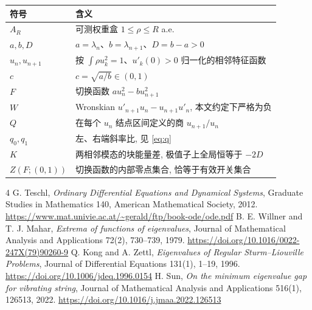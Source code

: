 \documentclass[UTF8]{ctexart}
\begin{document}
\begin{center}
\begin{tabular}{ll}
\toprule
符号 & 含义\\
\midrule
$A_R$ & 可测权重盒 $1\le\rho\le R$ a.e.\\
$a,b,D$ & $a=\lambda_n$、$b=\lambda_{n+1}$、$D=b-a>0$\\
$u_n,u_{n+1}$ & 按 $\int\rho u_k^2=1$、$u'_k(0)>0$ 归一化的相邻特征函数\\
$c$ & $c=\sqrt{a/b}\in(0,1)$\\
$F$ & 切换函数 $au_n^2-bu_{n+1}^2$\\
$W$ & Wronskian $u'_{n+1}u_n-u_{n+1}u'_n$, 本文约定下严格为负\\
$Q$ & 在每个 $u_n$ 结点区间定义的商 $u_{n+1}/u_n$\\
$q_0,q_1$ & 左、右端斜率比, 见 \eqref{eq:q}\\
$K$ & 两相邻模态的块能量差, 极值子上全局恒等于 $-2D$\\
$Z(F;(0,1))$ & 切换函数的内部零点集合, 恰等于有效开关集合\\
\bottomrule
\end{tabular}
\end{center}

\begin{thebibliography}{4}
 G. Teschl, \emph{Ordinary Differential Equations and Dynamical Systems},
	Graduate Studies in Mathematics 140, American Mathematical Society, 2012.
	\url{https://www.mat.univie.ac.at/~gerald/ftp/book-ode/ode.pdf}
 B. E. Willner and T. J. Mahar, \emph{Extrema of functions of eigenvalues},
	Journal of Mathematical Analysis and Applications 72(2), 730--739, 1979.
	\url{https://doi.org/10.1016/0022-247X(79)90260-9}
 Q. Kong and A. Zettl, \emph{Eigenvalues of Regular Sturm--Liouville Problems},
	Journal of Differential Equations 131(1), 1--19, 1996.
	\url{https://doi.org/10.1006/jdeq.1996.0154}
 H. Sun, \emph{On the minimum eigenvalue gap for vibrating string},
	Journal of Mathematical Analysis and Applications 516(1), 126513, 2022.
	\url{https://doi.org/10.1016/j.jmaa.2022.126513}
\end{thebibliography}
\end{document}
